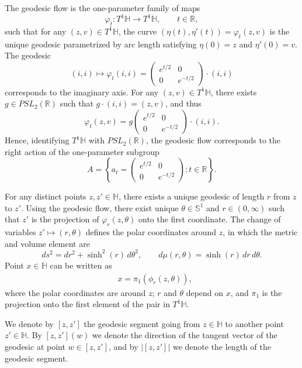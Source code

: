 \documentclass[11pt,twoside,reqno]{amsart} \usepackage{a4wide} \usepackage[T1]{fontenc} \usepackage[utf8]{inputenc} \usepackage{soul}  \usepackage{amsmath} \usepackage{amsfonts} \usepackage{amssymb} \usepackage{mathtools} \usepackage{amsthm} \usepackage{xcolor} \usepackage{graphicx} \usepackage{hyperref} \usepackage{standalone} \usepackage{esint} \usepackage{comment} \usepackage[left=2.3cm,top=3cm,right=2.3cm]{geometry} \usepackage{bm} \usepackage{svg} \usepackage{float} \numberwithin{equation}{section} \theoremstyle{plain} \newtheorem{thm}{Theorem}[section] \newtheorem{theorem}[thm]{Theorem} \newtheorem*{theorem*}{Theorem}\newtheorem{conj}[thm]{Conjecture} \newtheorem{lemma}[thm]{Lemma} \newtheorem{prop}[thm]{Proposition} \newtheorem{proposition}[thm]{Proposition} \newtheorem{cor}[thm]{Corollary} \newtheorem{question}[thm]{Question} \newtheorem{corollary}[thm]{Corollary} \newtheorem{assumption}[thm]{Assumption} \theoremstyle{definition} \newtheorem{defn}[thm]{Definition} \newtheorem{choice}[thm]{Choice} \newtheorem{definition}[thm]{Definition} \newtheorem{ex}[thm]{Example} \newtheorem{notation}[thm]{Notation} \newtheorem*{ack}{Acknowledgements} \theoremstyle{remark} \newtheorem{remark}[thm]{Remark} \newtheorem{bigremark}[thm]{Remark} \usepackage{xcolor} \newcommand{\red}[1]{ {\color{Red}#1} } \newcommand{\blue}[1]{ {\color{Blue}#1} } \author{Kai Hippi} \address{Aalto University, Espoo, Finland} \email{kai.hippi@aalto.fi}
\begin{document}
The geodesic flow is the one-parameter family of maps
\[
    \varphi_{t} : T^{1}\mathbb{H} \to T^{1}\mathbb{H}, \qquad t \in \mathbb{R},
\]
such that for any \( (z, v) \in T^{1}\mathbb{H} \), the curve \( (\eta(t), \eta'(t)) = \varphi_{t}(z, v) \) is the unique geodesic parametrized by arc length satisfying \( \eta(0) = z \) and \( \eta'(0) = v \). The geodesic
\[
    (i, i) \mapsto \varphi_{t}(i, i)
    = \begin{pmatrix} e^{t/2} & 0 \\ 0 & e^{-t/2} \end{pmatrix} \cdot (i, i)
\]
corresponds to the imaginary axis. For any \( (z, v) \in T^{1}\mathbb{H} \), there exists \( g \in PSL_{2}(\mathbb{R}) \) such that $ g \cdot (i, i) = (z, v) $, and thus
\[
    \varphi_{t}(z, v) = g
    \begin{pmatrix} e^{t/2} & 0 \\ 0 & e^{-t/2} \end{pmatrix}
    \cdot (i, i).
\]
Hence, identifying \( T^{1}\mathbb{H} \) with \( PSL_{2}(\mathbb{R}) \), the geodesic flow corresponds to the right action of the one-parameter subgroup
\[
    A = \left\{ a_{t} =
    \begin{pmatrix} e^{t/2} & 0 \\ 0 & e^{-t/2} \end{pmatrix}
    : t \in \mathbb{R} \right\}.
\]

For any distinct points \( z, z' \in \mathbb{H} \), there exists a unique geodesic of length \( r \) from \( z \) to \( z' \). Using the geodesic flow, there exist unique \( \theta \in \mathbb{S}^{1} \) and \( r \in (0, \infty) \) such that \( z' \) is the projection of \( \varphi_{r}(z, \theta) \) onto the first coordinate. The change of variables \( z' \mapsto (r, \theta) \) defines the polar coordinates around \( z \), in which the metric and volume element are
\[
    ds^{2} = dr^{2} + \sinh^{2}(r)\, d\theta^{2}, \qquad
    d\mu(r, \theta) = \sinh(r)\, dr\, d\theta.
\]
Point $ x \in \mathbb{H} $ can be written as
\begin{align*}
	&
	x = \pi_{1}( \phi_{r}( z, \theta ) ),
\end{align*}
where the polar coordinates are around $ z $; $ r $ and $ \theta $ depend on $ x $, and $ \pi_{1} $ is the projection onto the first element of the pair in $ T^{1} \mathbb{H} $.

We denote by \( [z, z'] \) the geodesic segment going from $ z \in \mathbb{H} $ to another point $ z' \in \mathbb{H} $. By \( [z, z'](w) \) we denote the direction of the tangent vector of the geodesic at point \( w \in [z, z'] \), and by \( |[z, z']| \) we denote the length of the geodesic segment.
\end{document}
